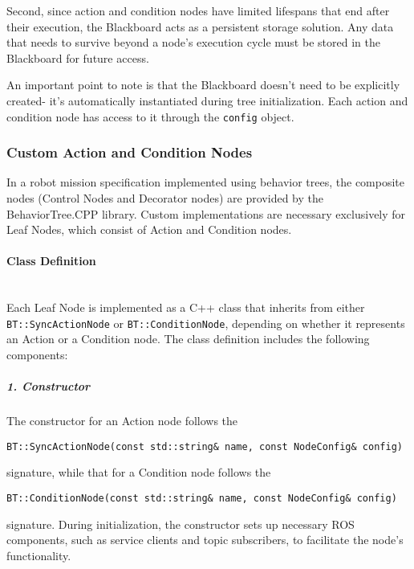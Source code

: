 \documentclass{CSSRforAfrica}
\begin{document}
Second, since action and condition nodes have limited lifespans that end after their execution, the Blackboard acts as a persistent storage solution. Any data that needs to survive beyond a node's execution cycle must be stored in the Blackboard for future access.

An important point to note is that the Blackboard doesn't need to be explicitly created- it's automatically instantiated during tree initialization. Each action and condition node has access to it through the \texttt{\small config} object.



\subsubsection{Custom Action and Condition Nodes}

In a robot mission specification implemented using behavior trees, the composite nodes (Control Nodes and Decorator nodes) are provided by the BehaviorTree.CPP library. Custom implementations are necessary exclusively for Leaf Nodes, which consist of Action and Condition nodes.

\paragraph{Class Definition}\mbox{}\\

Each Leaf Node is implemented as a C++ class that inherits from either \texttt{\small BT::SyncActionNode} or \texttt{\small BT::ConditionNode}, depending on whether it represents an Action or a Condition node. The class definition includes the following components:

\subparagraph{1. Constructor}

The constructor for an Action node follows the 
\begin{lstlisting}[style=cppstyle]
    BT::SyncActionNode(const std::string& name, const NodeConfig& config)
\end{lstlisting}
signature, while that for a Condition node follows the 
\begin{lstlisting}[style=cppstyle]
    BT::ConditionNode(const std::string& name, const NodeConfig& config)
\end{lstlisting}
signature. During initialization, the constructor sets up necessary ROS components, such as service clients and topic subscribers, to facilitate the node's functionality.
\end{document}
